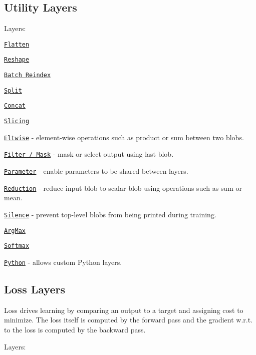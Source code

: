 \subsection*{Utility Layers}

Layers\+:


\begin{DoxyItemize}
\item \href{layers/flatten.html}{\tt Flatten}
\item \href{layers/reshape.html}{\tt Reshape}
\item \href{layers/batchreindex.html}{\tt Batch Reindex}
\item \href{layers/split.html}{\tt Split}
\item \href{layers/concat.html}{\tt Concat}
\item \href{layers/slice.html}{\tt Slicing}
\item \href{layers/eltwise.html}{\tt Eltwise} -\/ element-\/wise operations such as product or sum between two blobs.
\item \href{layers/filter.html}{\tt Filter / Mask} -\/ mask or select output using last blob.
\item \href{layers/parameter.html}{\tt Parameter} -\/ enable parameters to be shared between layers.
\item \href{layers/reduction.html}{\tt Reduction} -\/ reduce input blob to scalar blob using operations such as sum or mean.
\item \href{layers/silence.html}{\tt Silence} -\/ prevent top-\/level blobs from being printed during training.
\item \href{layers/argmax.html}{\tt Arg\+Max}
\item \href{layers/softmax.html}{\tt Softmax}
\item \href{layers/python.html}{\tt Python} -\/ allows custom Python layers.
\end{DoxyItemize}

\subsection*{Loss Layers}

Loss drives learning by comparing an output to a target and assigning cost to minimize. The loss itself is computed by the forward pass and the gradient w.\+r.\+t. to the loss is computed by the backward pass.

Layers\+:


